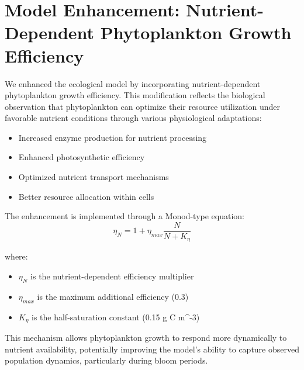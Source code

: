 \section{Model Enhancement: Nutrient-Dependent Phytoplankton Growth Efficiency}

We enhanced the ecological model by incorporating nutrient-dependent phytoplankton growth efficiency. This modification reflects the biological observation that phytoplankton can optimize their resource utilization under favorable nutrient conditions through various physiological adaptations:

\begin{itemize}
    \item Increased enzyme production for nutrient processing
    \item Enhanced photosynthetic efficiency
    \item Optimized nutrient transport mechanisms
    \item Better resource allocation within cells
\end{itemize}

The enhancement is implemented through a Monod-type equation:
\[ \eta_N = 1 + \eta_{max} \frac{N}{N + K_{\eta}} \]

where:
\begin{itemize}
    \item $\eta_N$ is the nutrient-dependent efficiency multiplier
    \item $\eta_{max}$ is the maximum additional efficiency (0.3)
    \item $K_{\eta}$ is the half-saturation constant (0.15 g C m^{-3})
\end{itemize}

This mechanism allows phytoplankton growth to respond more dynamically to nutrient availability, potentially improving the model's ability to capture observed population dynamics, particularly during bloom periods.
